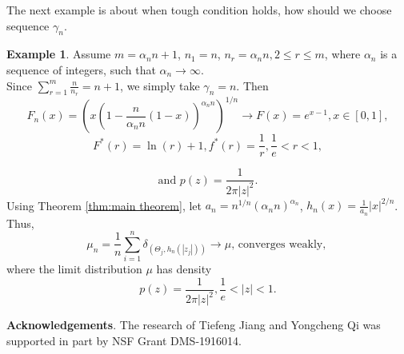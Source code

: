 \documentclass[12pt]{article}
\theoremstyle{plain}
\theoremstyle{definition}
\newtheorem{exm}{\textbf{Example}}
\theoremstyle{remark}
\begin{document}
The next example is about when tough condition holds, how should we choose sequence $\gamma_n$.
\begin{exm}
	Assume $m=\alpha_n n+1$, $n_{1}=n$, $n_r=\alpha_n n, 2\leq r \leq m$, where $\alpha_n$ is a sequence of integers, such that $\alpha_n\rightarrow \infty$.\\
	Since $\sum_{r=1}^{m} \frac{n}{n_{r}}=n+1$, we simply take $\gamma_n=n$. Then 
	\begin{equation*}
	F_n(x)=(x(1-\frac{n}{\alpha_n n}(1-x))^{\alpha_n n})^{1/n}\rightarrow F(x)=e^{x-1}, x\in [0,1],
	\end{equation*}
	\begin{equation*}
	F^*(r)=\ln (r)+1, f^*(r)=\frac{1}{r}, \frac{1}{e}<r<1,
	\end{equation*}
\begin{center}
\end{center}	 
	\begin{equation*}
\text{and  }	p(z)=\frac{1}{2\pi |z|^2}.
	\end{equation*}
	Using Theorem \ref{thm:main theorem}, let $a_{n}=n^{1/n}(\alpha_n n)^{\alpha_n }$, $h_{n}(x)=\frac{1}{a_{n}}|x|^{2 / {n}}$. 
	Thus, 
	\begin{equation*}
	\mu_{n}=\frac{1}{n} \sum_{i=1}^{n} \delta_{\left(\Theta_{j}, h_{n}\left(\left|z_{j}\right|\right)\right)} \rightarrow \mu  \text {, converges weakly, }
	\end{equation*}
	where the limit distribution $\mu$ has density 
	\begin{equation*}
   p(z)=\frac{1}{2\pi |z|^2}, \frac{1}{e}<|z|<1.
	\end{equation*}
\end{exm}


\textbf{Acknowledgements}. The research of Tiefeng Jiang and Yongcheng Qi was supported in part by NSF Grant DMS-1916014.
\end{document}
